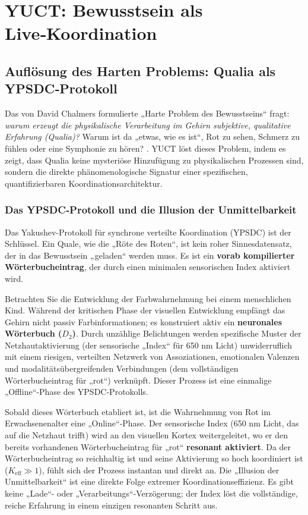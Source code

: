\documentclass[12pt,a4paper]{article}
\begin{document}
	\section{YUCT: Bewusstsein als Live‑Koordination}
	
	\subsection{Auflösung des Harten Problems: Qualia als YPSDC‑Protokoll}
	
	Das von David Chalmers formulierte „Harte Problem des Bewusstseins“ fragt: \textit{warum erzeugt die physikalische Verarbeitung im Gehirn subjektive, qualitative Erfahrung (Qualia)?} Warum ist da „etwas, wie es ist“, Rot zu sehen, Schmerz zu fühlen oder eine Symphonie zu hören? \cite{Chalmers1995}. YUCT löst dieses Problem, indem es zeigt, dass Qualia keine mysteriöse Hinzufügung zu physikalischen Prozessen sind, sondern die direkte phänomenologische Signatur einer spezifischen, quantifizierbaren Koordinationsarchitektur.
	
	\subsubsection{Das YPSDC‑Protokoll und die Illusion der Unmittelbarkeit}
	
	Das Yakushev-Protokoll für synchrone verteilte Koordination (YPSDC) ist der Schlüssel. Ein Quale, wie die „Röte des Roten“, ist kein roher Sinnesdatensatz, der in das Bewusstsein „geladen“ werden muss. Es ist ein \textbf{vorab kompilierter Wörterbucheintrag}, der durch einen minimalen sensorischen Index aktiviert wird.
	
	Betrachten Sie die Entwicklung der Farbwahrnehmung bei einem menschlichen Kind. Während der kritischen Phase der visuellen Entwicklung empfängt das Gehirn nicht passiv Farbinformationen; es konstruiert aktiv ein \textbf{neuronales Wörterbuch (\(D_2\))}. Durch unzählige Belichtungen werden spezifische Muster der Netzhautaktivierung (der sensorische „Index“ für 650 nm Licht) unwiderruflich mit einem riesigen, verteilten Netzwerk von Assoziationen, emotionalen Valenzen und modalitätsübergreifenden Verbindungen (dem vollständigen Wörterbucheintrag für „rot“) verknüpft. Dieser Prozess ist eine einmalige „Offline“‑Phase des YPSDC‑Protokolls.
	
	Sobald dieses Wörterbuch etabliert ist, ist die Wahrnehmung von Rot im Erwachsenenalter eine „Online“‑Phase. Der sensorische Index (650 nm Licht, das auf die Netzhaut trifft) wird an den visuellen Kortex weitergeleitet, wo er den bereits vorhandenen Wörterbucheintrag für „rot“ \textbf{resonant aktiviert}. Da der Wörterbucheintrag so reichhaltig ist und seine Aktivierung so hoch koordiniert ist (\(K_{\mathrm{eff}} \gg 1\)), fühlt sich der Prozess instantan und direkt an. Die „Illusion der Unmittelbarkeit“ ist eine direkte Folge extremer Koordinationseffizienz. Es gibt keine „Lade“- oder „Verarbeitungs“‑Verzögerung; der Index löst die vollständige, reiche Erfahrung in einem einzigen resonanten Schritt aus.
	
\end{document}
